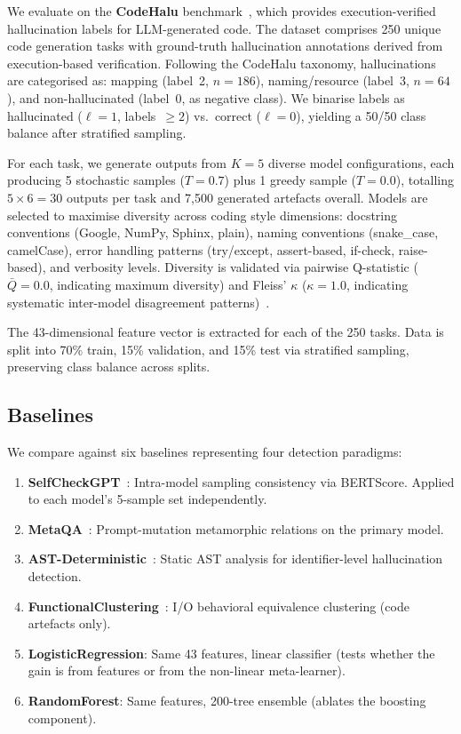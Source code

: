 \documentclass[11pt,a4paper]{article}
\begin{document}
We evaluate on the \textbf{CodeHalu} benchmark~\cite{tian2025codehalu}, which provides execution-verified hallucination labels for LLM-generated code. The dataset comprises 250 unique code generation tasks with ground-truth hallucination annotations derived from execution-based verification. Following the CodeHalu taxonomy, hallucinations are categorised as: mapping (label~2, $n=186$), naming/resource (label~3, $n=64$), and non-hallucinated (label~0, as negative class). We binarise labels as hallucinated ($\ell=1$, labels~$\geq 2$) vs.\ correct ($\ell=0$), yielding a 50/50 class balance after stratified sampling.

For each task, we generate outputs from $K=5$ diverse model configurations, each producing 5 stochastic samples ($T=0.7$) plus 1 greedy sample ($T=0.0$), totalling $5 \times 6 = 30$ outputs per task and 7,500 generated artefacts overall. Models are selected to maximise diversity across coding style dimensions: docstring conventions (Google, NumPy, Sphinx, plain), naming conventions (snake\_case, camelCase), error handling patterns (try/except, assert-based, if-check, raise-based), and verbosity levels. Diversity is validated via pairwise Q-statistic ($\bar{Q} = 0.0$, indicating maximum diversity) and Fleiss' $\kappa$ ($\kappa = 1.0$, indicating systematic inter-model disagreement patterns)~\cite{brown2005diversity}.

The 43-dimensional feature vector is extracted for each of the 250 tasks. Data is split into 70\% train, 15\% validation, and 15\% test via stratified sampling, preserving class balance across splits.

\subsection{Baselines}
\label{sec:baselines}

We compare against six baselines representing four detection paradigms:
\begin{enumerate}
\item \textbf{SelfCheckGPT}~\cite{manakul2023selfcheckgpt}: Intra-model sampling consistency via BERTScore. Applied to each model's 5-sample set independently.
\item \textbf{MetaQA}~\cite{yang2025metaqa}: Prompt-mutation metamorphic relations on the primary model.
\item \textbf{AST-Deterministic}~\cite{khati2026ast}: Static AST analysis for identifier-level hallucination detection.
\item \textbf{FunctionalClustering}~\cite{ravuri2025clustering}: I/O behavioral equivalence clustering (code artefacts only).
\item \textbf{LogisticRegression}: Same 43 features, linear classifier (tests whether the gain is from features or from the non-linear meta-learner).
\item \textbf{RandomForest}: Same features, 200-tree ensemble (ablates the boosting component).
\end{enumerate}
\end{document}
